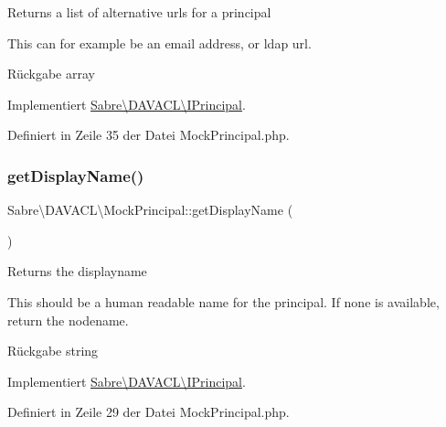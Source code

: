 Returns a list of alternative urls for a principal

This can for example be an email address, or ldap url.

\begin{DoxyReturn}{Rückgabe}
array 
\end{DoxyReturn}


Implementiert \mbox{\hyperlink{interface_sabre_1_1_d_a_v_a_c_l_1_1_i_principal_ac28ebb97541a792d73dd4e15d3b8cdb6}{Sabre\textbackslash{}\+D\+A\+V\+A\+C\+L\textbackslash{}\+I\+Principal}}.



Definiert in Zeile 35 der Datei Mock\+Principal.\+php.

\mbox{\label{class_sabre_1_1_d_a_v_a_c_l_1_1_mock_principal_ade06f3efdbb9f386b823cbd861c68416}} 
\subsubsection{\texorpdfstring{get\+Display\+Name()}{getDisplayName()}}
{\footnotesize\ttfamily Sabre\textbackslash{}\+D\+A\+V\+A\+C\+L\textbackslash{}\+Mock\+Principal\+::get\+Display\+Name (\begin{DoxyParamCaption}{ }\end{DoxyParamCaption})}

Returns the displayname

This should be a human readable name for the principal. If none is available, return the nodename.

\begin{DoxyReturn}{Rückgabe}
string 
\end{DoxyReturn}


Implementiert \mbox{\hyperlink{interface_sabre_1_1_d_a_v_a_c_l_1_1_i_principal_aff7f7f00c81458d5d9e20e28f4d32461}{Sabre\textbackslash{}\+D\+A\+V\+A\+C\+L\textbackslash{}\+I\+Principal}}.



Definiert in Zeile 29 der Datei Mock\+Principal.\+php.

\mbox{\label{class_sabre_1_1_d_a_v_a_c_l_1_1_mock_principal_a1bbf28a5c948869c2f1d94571906b6e4}} 
